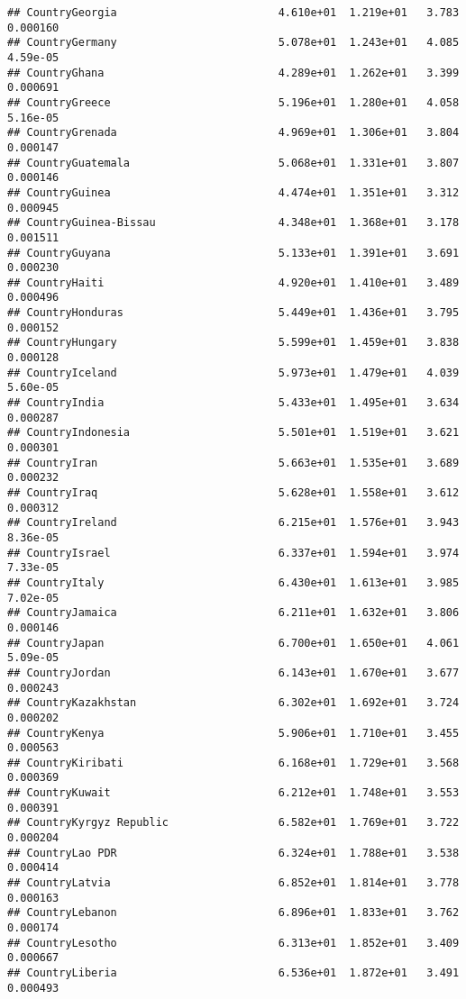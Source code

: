 \documentclass[
]{article}
\begin{document}
\begin{verbatim}
## CountryGeorgia                         4.610e+01  1.219e+01   3.783 0.000160
## CountryGermany                         5.078e+01  1.243e+01   4.085 4.59e-05
## CountryGhana                           4.289e+01  1.262e+01   3.399 0.000691
## CountryGreece                          5.196e+01  1.280e+01   4.058 5.16e-05
## CountryGrenada                         4.969e+01  1.306e+01   3.804 0.000147
## CountryGuatemala                       5.068e+01  1.331e+01   3.807 0.000146
## CountryGuinea                          4.474e+01  1.351e+01   3.312 0.000945
## CountryGuinea-Bissau                   4.348e+01  1.368e+01   3.178 0.001511
## CountryGuyana                          5.133e+01  1.391e+01   3.691 0.000230
## CountryHaiti                           4.920e+01  1.410e+01   3.489 0.000496
## CountryHonduras                        5.449e+01  1.436e+01   3.795 0.000152
## CountryHungary                         5.599e+01  1.459e+01   3.838 0.000128
## CountryIceland                         5.973e+01  1.479e+01   4.039 5.60e-05
## CountryIndia                           5.433e+01  1.495e+01   3.634 0.000287
## CountryIndonesia                       5.501e+01  1.519e+01   3.621 0.000301
## CountryIran                            5.663e+01  1.535e+01   3.689 0.000232
## CountryIraq                            5.628e+01  1.558e+01   3.612 0.000312
## CountryIreland                         6.215e+01  1.576e+01   3.943 8.36e-05
## CountryIsrael                          6.337e+01  1.594e+01   3.974 7.33e-05
## CountryItaly                           6.430e+01  1.613e+01   3.985 7.02e-05
## CountryJamaica                         6.211e+01  1.632e+01   3.806 0.000146
## CountryJapan                           6.700e+01  1.650e+01   4.061 5.09e-05
## CountryJordan                          6.143e+01  1.670e+01   3.677 0.000243
## CountryKazakhstan                      6.302e+01  1.692e+01   3.724 0.000202
## CountryKenya                           5.906e+01  1.710e+01   3.455 0.000563
## CountryKiribati                        6.168e+01  1.729e+01   3.568 0.000369
## CountryKuwait                          6.212e+01  1.748e+01   3.553 0.000391
## CountryKyrgyz Republic                 6.582e+01  1.769e+01   3.722 0.000204
## CountryLao PDR                         6.324e+01  1.788e+01   3.538 0.000414
## CountryLatvia                          6.852e+01  1.814e+01   3.778 0.000163
## CountryLebanon                         6.896e+01  1.833e+01   3.762 0.000174
## CountryLesotho                         6.313e+01  1.852e+01   3.409 0.000667
## CountryLiberia                         6.536e+01  1.872e+01   3.491 0.000493

\end{verbatim}
\end{document}

